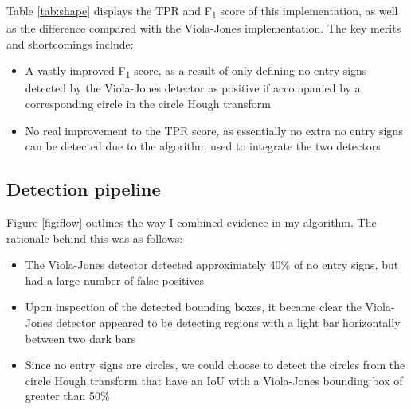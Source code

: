 \documentclass[twocolumn, 10pt, a4paper]{article}
\begin{document}
Table \ref{tab:shape} displays the TPR and F\textsubscript{1} score of this implementation, as well as the difference compared with the Viola-Jones implementation.
The key merits and shortcomings include:
\begin{itemize}
\itemsep 0em 
\item A vastly improved F\textsubscript{1} score, as a result of only defining no entry signs detected by the Viola-Jones detector as positive if accompanied by a corresponding circle in the circle Hough transform
\item No real improvement to the TPR score, as essentially no extra no entry signs can be detected due to the algorithm used to integrate the two detectors
\end{itemize}

\subsection{Detection pipeline}

Figure \ref{fig:flow} outlines the way I combined evidence in my algorithm.
The rationale behind this was as follows:
\begin{itemize}
\itemsep 0em 
\item The Viola-Jones detector detected approximately 40\% of no entry signs, but had a large number of false positives
\item Upon inspection of the detected bounding boxes, it became clear the Viola-Jones detector appeared to be detecting regions with a light bar horizontally between two dark bars
\item Since no entry signs are circles, we could choose to detect the circles from the circle Hough transform that have an IoU with a Viola-Jones bounding box of greater than 50\%
\end{itemize}
\end{document}
